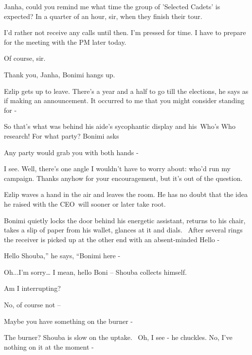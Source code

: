 \documentclass[12pt]{book}
\begin{document}
{\textquotedbl}Janha, could you remind me what time the group of 'Selected Cadets'{ }is
expected?{\textquotedbl} {\textquotedbl}In a quarter of an hour, sir, when they finish their tour.{\textquotedbl}

{\textquotedbl}I'd rather not receive any calls until then. I'm pressed for time. I have to prepare for the meeting with
the PM later today.{\textquotedbl}

{\textquotedbl}Of course, sir.{\textquotedbl}

{\textquotedbl}Thank you, Janha,{\textquotedbl} Bonimi hangs up.

Ezlip gets up to leave. {\textquotedbl}There's a year and a half to go till the elections,{\textquotedbl} he says as if
making an announcement. {\textquotedbl}It occurred to me that you might consider standing for -{\textquotedbl}

So that's what was behind his aide's sycophantic display{ }and his~{\textquotedbl}Who's
Who{\textquotedbl} research! {\textquotedbl}For what party?{\textquotedbl} Bonimi asks

{\textquotedbl}Any party would grab you with both hands - {\textquotedbl}

{\textquotedbl}I see. Well, there's one angle{ }I wouldn't have to worry about: who'd run my campaign.
Thanks anyhow for your encouragement, but it's out of the question.{\textquotedbl}

Ezlip waves a hand in the air and leaves the room. He has no doubt that the idea he raised with the CEO~will sooner or
later take root{. }

Bonimi quietly locks the door behind his energetic assistant, returns to his chair, takes a slip of paper from his
wallet, glances at it and dials.~ After several rings the receiver is picked up at the other end with an absent-minded
{\textquotedbl}Hello -{\textquotedbl}

{\textquotedbl}Hello Shouba,'' he says, ``Bonimi here -{\textquotedbl}

{\textquotedbl}Oh...I'm sorry{\dots} I mean, hello Boni --{\textquotedbl} Shouba collects himself.

{\textquotedbl}Am I interrupting?{\textquotedbl}

{\textquotedbl}No, of course not --{\textquotedbl}

{\textquotedbl}Maybe you have something on the burner -{\textquotedbl}

{\textquotedbl}The burner?{\textquotedbl} Shouba is slow on the uptake. ~{\textquotedbl}Oh, I see -{\textquotedbl} he
chuckles. {\textquotedbl}No, I've nothing on it at the moment -{\textquotedbl}
\end{document}
